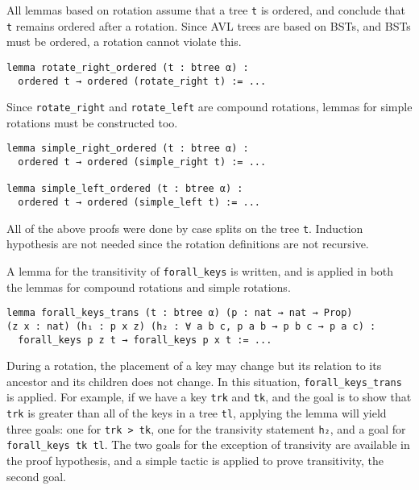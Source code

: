 All lemmas based on rotation assume that a tree \lstinline{t} is ordered, and conclude that \lstinline{t} remains ordered after a rotation. Since AVL trees are based on BSTs, and BSTs must be ordered, a rotation cannot violate this.

\begin{lstlisting}
lemma rotate_right_ordered (t : btree α) :
  ordered t → ordered (rotate_right t) := ...
\end{lstlisting}

Since \lstinline{rotate_right} and \lstinline{rotate_left} are compound rotations, lemmas for simple rotations must be constructed too. 

\begin{lstlisting}
lemma simple_right_ordered (t : btree α) :
  ordered t → ordered (simple_right t) := ...

lemma simple_left_ordered (t : btree α) :
  ordered t → ordered (simple_left t) := ...
\end{lstlisting}

All of the above proofs were done by case splits on the tree \lstinline{t}. Induction hypothesis are not needed since the rotation definitions are not recursive. 

A lemma for the transitivity of \lstinline{forall_keys} is written, and is applied in both the lemmas for compound rotations and simple rotations.

\begin{lstlisting}
lemma forall_keys_trans (t : btree α) (p : nat → nat → Prop) 
(z x : nat) (h₁ : p x z) (h₂ : ∀ a b c, p a b → p b c → p a c) :
  forall_keys p z t → forall_keys p x t := ...
\end{lstlisting}

During a rotation, the placement of a key may change but its relation to its ancestor and its children does not change. In this situation, \lstinline{forall_keys_trans} is applied. For example, if we have a key \lstinline{trk} and \lstinline{tk}, and the goal is to show that \lstinline{trk} is greater than all of the keys in a tree \lstinline{tl}, applying the lemma will yield three goals: one for \lstinline{trk > tk}, one for the transivity statement \lstinline{h₂}, and a goal for \lstinline{forall_keys tk tl}. The two goals for the exception of transivity are available in the proof hypothesis, and a simple tactic is applied to prove transitivity, the second goal.
